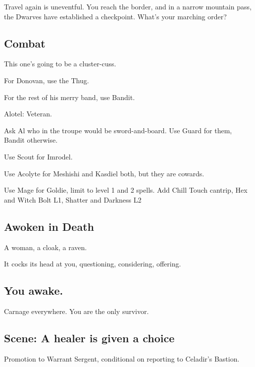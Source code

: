\begin{multicols}{2}
Travel again is uneventful.
You reach the border, and in a narrow mountain pass, the Dwarves have established a checkpoint.
What's your marching order?

\subsection{Combat}

This one's going to be a cluster-cuss.

For Donovan, use the Thug.

For the rest of his merry band, use Bandit.

Alotel: Veteran.

Ask Al who in the troupe would be sword-and-board.
Use Guard for them, Bandit otherwise.

Use Scout for Imrodel.

Use Acolyte for Meshishi and Kasdiel both, but they are cowards.

Use Mage for Goldie, limit to level 1 and 2 spells.
Add Chill Touch cantrip, Hex and Witch Bolt L1, Shatter and Darkness L2

\subsection{Awoken in Death}

A woman, a cloak, a raven.

It cocks its head at you, questioning, considering, offering.

\subsection{You awake.}

Carnage everywhere.
You are the only survivor.

\subsection{Scene: A healer is given a choice}

Promotion to Warrant Sergent, conditional on reporting to Celadir's Bastion.

\end{multicols}
